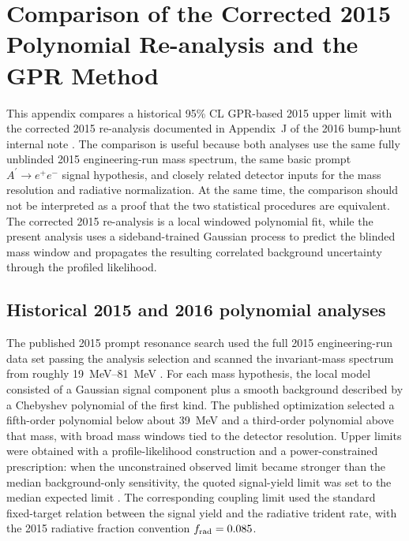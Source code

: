 \section{Comparison of the Corrected 2015 Polynomial Re-analysis and the GPR Method}
\label{app:2015-method-comparison}

This appendix compares a historical 95\% CL GPR-based 2015 upper limit with the corrected
2015 re-analysis documented in Appendix~J of the 2016 bump-hunt internal note
\cite{HPS2016BumpInternal}.  The comparison is useful because both analyses use the
same fully unblinded 2015 engineering-run mass spectrum, the same basic prompt
$A^\prime\to e^+e^-$ signal hypothesis, and closely related detector inputs for the
mass resolution and radiative normalization.  At the same time, the comparison should
not be interpreted as a proof that the two statistical procedures are equivalent.  The
corrected 2015 re-analysis is a local windowed polynomial fit, while the present
analysis uses a sideband-trained Gaussian process to predict the blinded mass window
and propagates the resulting correlated background uncertainty through the profiled
likelihood.

\subsection{Historical 2015 and 2016 polynomial analyses}

The published 2015 prompt resonance search used the full 2015 engineering-run data set
passing the analysis selection and scanned the invariant-mass spectrum from roughly
\SIrange{19}{81}{MeV} \cite{HPS2015DarkPhoton,HPS2015InternalNote}.  For each mass
hypothesis, the local model consisted of a Gaussian signal component plus a smooth
background described by a Chebyshev polynomial of the first kind.  The published
optimization selected a fifth-order polynomial below about \SI{39}{MeV} and a
third-order polynomial above that mass, with broad mass windows tied to the detector
resolution.  Upper limits were obtained with a profile-likelihood construction and a
power-constrained prescription: when the unconstrained observed limit became stronger
than the median background-only sensitivity, the quoted signal-yield limit was set to
the median expected limit \cite{HPS2015InternalNote}.  The corresponding coupling
limit used the standard fixed-target relation between the signal yield and the
radiative trident rate, with the 2015 radiative fraction convention
$f_{\rm rad}=0.085$.

